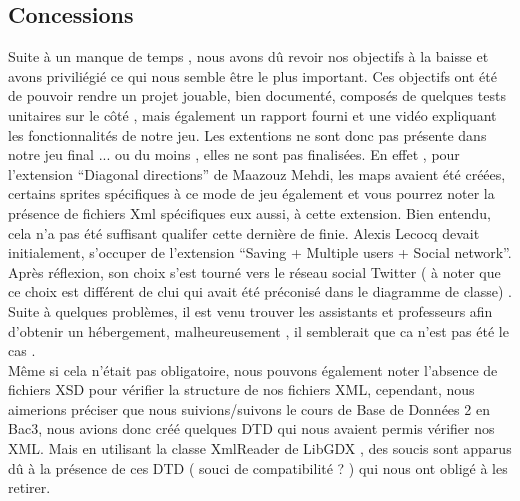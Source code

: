 \documentclass[a4paper,10pt]{article}
\begin{document}
\subsection{Concessions}
Suite à un manque de temps , nous avons dû revoir nos objectifs à la baisse et avons priviliégié ce qui nous semble être le plus important. 
Ces objectifs ont été de pouvoir rendre un projet jouable, bien documenté, composés de quelques tests unitaires sur le côté , mais 
également un rapport fourni et une vidéo expliquant les fonctionnalités de notre jeu. 
Les extentions ne sont donc pas présente dans notre jeu final ... ou du moins , elles ne sont pas finalisées.
En effet , pour l'extension ``Diagonal directions'' de Maazouz Mehdi, les maps avaient été créées, certains sprites spécifiques à ce mode de jeu également
et vous pourrez noter la présence de fichiers Xml spécifiques eux aussi, à cette extension. Bien entendu, cela n'a pas été suffisant qualifer
cette dernière de finie.
Alexis Lecocq devait initialement, s'occuper de l'extension ``Saving + Multiple users + Social network''. Après réflexion, son choix
s'est tourné vers le réseau social Twitter ( à noter que ce choix est différent de clui qui avait été préconisé dans le diagramme de classe)
. Suite à quelques problèmes, il est venu trouver les assistants et professeurs afin d'obtenir un hébergement,
malheureusement , il semblerait que ca n'est pas été le cas .\\

Même si cela n'était pas obligatoire, nous pouvons également noter l'absence de fichiers XSD pour vérifier la structure de nos fichiers XML, cependant,
 nous aimerions préciser que nous suivions/suivons le cours de Base de Données 2 en Bac3, nous avions donc créé quelques DTD qui 
 nous avaient permis vérifier nos XML.
 Mais en utilisant la classe XmlReader de LibGDX , des soucis sont apparus dû à la présence de ces DTD ( souci de compatibilité ? ) qui nous ont obligé
 à les retirer.
\end{document}
